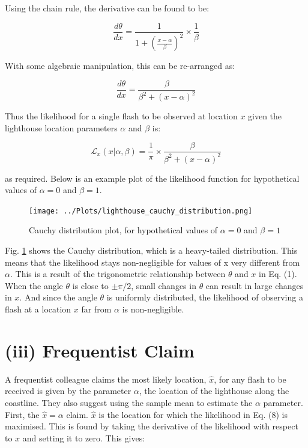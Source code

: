 \documentclass[12pt]{report} %
\begin{document}
Using the chain rule, the derivative can be found to be:

\begin{equation}
    \frac{d\theta}{dx} = \frac{1}{1 + \left(\frac{x - \alpha}{\beta}\right)^{2}} \times \frac{1}{\beta}
\end{equation}

With some algebraic manipulation, this can be re-arranged as:

\begin{equation}
    \frac{d\theta}{dx} = \frac{\beta}{\beta^{2} + (x - \alpha)^{2}}
\end{equation}

Thus the likelihood for a single flash to be observed at location $x$ given the lighthouse location parameters $\alpha$ and $\beta$ is:

\begin{equation}
    \mathcal{L}_{x}(x|\alpha, \beta) = \frac{1}{\pi} \times \frac{\beta}{\beta^{2} + (x - \alpha)^{2}}
\end{equation}

as required. Below is an example plot of the likelihood function for hypothetical values of $\alpha = 0$ and $\beta = 1$.

\begin{figure}[h]
\centering
\texttt{[image: ../Plots/lighthouse\_cauchy\_distribution.png]}
\caption{Cauchy distribution plot, for hypothetical values of $\alpha = 0$ and $\beta = 1$}
\label{fig:cauchy_distribution}
\end{figure}

Fig. \ref{fig:cauchy_distribution} shows the Cauchy distribution, which is a heavy-tailed distribution. This means that the likelihood stays non-negligible for values of x very different from $\alpha$. This is a result of the trigonometric relationship between $\theta$ and $x$ in Eq. (1). When the angle $\theta$ is close to $\pm \pi/2$, small changes in $\theta$ can result in large changes in $x$. And since the angle $\theta$ is uniformly distributed, the likelihood of observing a flash at a location $x$ far from $\alpha$ is non-negligible.

\section*{(iii) Frequentist Claim}

A frequentist colleague claims the most likely location, $\hat{x}$, for any flash to be received is given by the parameter $\alpha$, the location of the lighthouse along the coastline. They also suggest using the sample mean to estimate the $\alpha$ parameter. First, the $\hat{x} = \alpha$ claim. $\hat{x}$ is the location for which the likelihood in Eq. (8) is maximised. This is found by taking the derivative of the likelihood with respect to $x$ and setting it to zero. This gives:
\end{document}

